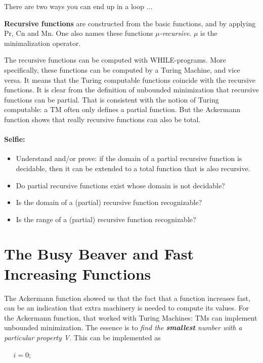 There are two ways you can end up in a loop ...

\begin{definition}
{\bf Recursive functions} are constructed from the basic functions,
and by applying Pr, Cn and Mn. One also names these functions {\em
  $\mu$-recursive}. $\mu$ is the minimalization operator.
\end{definition}

The recursive functions can be computed with WHILE-programs. More
specifically, these functions can be computed by a Turing Machine, and
vice versa. It means that the Turing computable functions coincide with
the recursive functions. It is clear from the definition of unbounded
minimization that recursive functions can be partial. That is
consistent with the notion of Turing computable: a TM often only defines
a partial function. But the Ackermann function shows that really
recursive functions can also be total.


\paragraph{Selfie:}
\begin{itemize}
\item[]
Understand and/or prove: if the domain of a partial recursive function
is decidable, then it can be extended to a total function that is also
recursive.
\item[]
Do partial recursive functions exist whose domain is not decidable?
\item[]
Is the domain of a (partial) recursive function recognizable?
\item[]
Is the range of a (partial) recursive function recognizable?
\end{itemize}


\section{The Busy Beaver and Fast Increasing Functions}

The Ackermann function showed us that the fact that a function
increases fast, can be an indication that extra machinery is needed to
compute its values. For the Ackermann function, that worked with
Turing Machines: TMs can implement unbounded minimization. The essence
is to {\em find the {\bf smallest} number with a particular property
  V}. This can be implemented as

$~~~~~~i = 0;$

